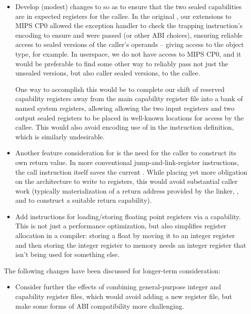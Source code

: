 \begin{itemize}
\item Develop (modest) changes to  so as to
  ensure that the two sealed capabilities are in expected registers for the
  callee.
  In the original , our extensions to MIPS CP0 allowed the exception handler to
  check the trapping instruction's encoding to ensure  and 
  were passed (or other ABI choices), ensuring reliable access to sealed
  versions of the caller's operands -- giving access to the object type, for
  example.
  In userspace, we do not have access to MIPS CP0, and it would be preferable
  to find some other way to reliably pass not just the unsealed versions, but
  also caller sealed versions, to the callee.

  One way to accomplish this would be to complete our shift of reserved
  capability registers away from the main capability register file into a bank
  of named system registers, allowing allowing the two input registers and two
  output sealed registers to be placed in well-known locations for access by
  the callee.
  This would also avoid encoding use of \IDC{} in the instruction definition,
  which is similarly undesirable.


\item
  Another feature consideration for  is the
  need for the caller to construct its own return \PCC{} value.
  In more conventional  jump-and-link-register
  instructions, the call instruction itself saves the current \PCC{}.
  While placing yet more obligation on the architecture to write to registers,
  this would avoid substantial caller work (typically materialization of a
  return address provided by the linker, , and
   to construct a suitable return capability).

\item Add instructions for loading/storing floating point registers via a
  capability. This is not just a performance optimization, but also simplifies
  register allocation in a compiler: storing a float by moving it to an
  integer register and then storing the integer register to memory needs an
  integer register that isn't being used for something else.
\end{itemize}

The following changes have been discussed for longer-term consideration:

\begin{itemize}
\item
  Consider further the effects of combining general-purpose integer and capability
  register files, which would avoid adding a new register file, but make some
  forms of ABI compatibility more challenging.
\end{itemize}
